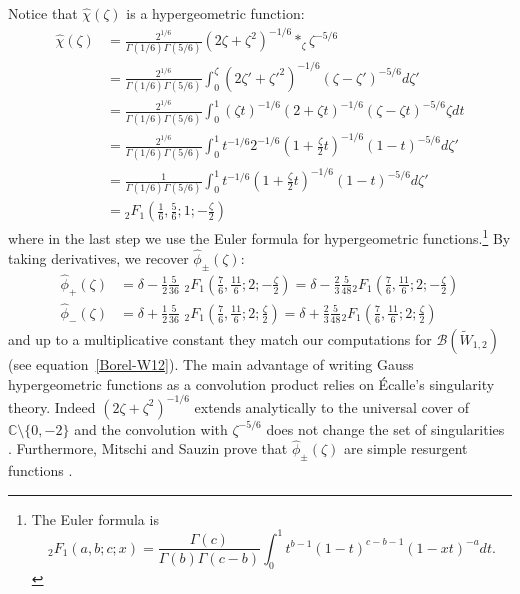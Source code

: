 \documentclass{article}
\newcommand{\C}{\mathbb{C}}
\newcommand{\series}[1]{\tilde{#1}}
\newcommand{\borel}{\mathcal{B}}
\theoremstyle{definition}
\theoremstyle{plain}
\begin{document}
Notice that $\hat{\chi}(\zeta)$ is a hypergeometric function:
\begin{align*}
\hat{\chi}(\zeta)&=\frac{2^{1/6}}{\Gamma(1/6)\Gamma(5/6)}(2\zeta+\zeta^2)^{-1/6}\ast_\zeta \zeta^{-5/6}\\
&=\frac{2^{1/6}}{\Gamma(1/6)\Gamma(5/6)}\int_0^{\zeta}(2\zeta'+\zeta'^2)^{-1/6} (\zeta-\zeta')^{-5/6}d\zeta'\\
&=\frac{2^{1/6}}{\Gamma(1/6)\Gamma(5/6)}\int_0^{1}(\zeta t)^{-1/6}(2+\zeta t)^{-1/6} (\zeta-\zeta t)^{-5/6} \zeta dt\\
&=\frac{2^{1/6}}{\Gamma(1/6)\Gamma(5/6)}\int_0^{1} t^{-1/6} 2^{-1/6}(1+\frac{\zeta}{2} t)^{-1/6} (1-t)^{-5/6}d\zeta'\\
&=\frac{1}{\Gamma(1/6)\Gamma(5/6)}\int_0^{1} t^{-1/6} (1+\frac{\zeta}{2} t)^{-1/6} (1-t)^{-5/6}d\zeta'\\
&={}_2F_1\left(\frac{1}{6},\frac{5}{6};1;-\frac{\zeta}{2}\right)
\end{align*}
where in the last step we use the Euler formula for hypergeometric functions.\footnote{The Euler formula is \begin{equation}\label{Euler formula}
{}_{2}F_1\left(a,b;c;x\right)=\frac{\Gamma(c)}{\Gamma(b)\Gamma(c-b)}\int_0^1 t^{b-1}(1-t)^{c-b-1}(1-xt)^{-a}dt.
\end{equation}} By taking derivatives, we recover $\hat{\phi}_{\pm}(\zeta)$: 
\begin{align*}
\hat{\phi}_+(\zeta)&=\delta-\frac{1}{2}\frac{5}{36}\,\, {}_2F_1\left(\frac{7}{6},\frac{11}{6};2;-\frac{\zeta}{2}\right)=\delta-\frac{2}{3}\frac{5}{48} {}_2F_1\left(\frac{7}{6},\frac{11}{6};2;-\frac{\zeta}{2}\right)\\
\hat{\phi}_-(\zeta)&=\delta+\frac{1}{2}\frac{5}{36}\,\, {}_2F_1\left(\frac{7}{6},\frac{11}{6};2;\frac{\zeta}{2}\right)=\delta+\frac{2}{3}\frac{5}{48} {}_2F_1\left(\frac{7}{6},\frac{11}{6};2;\frac{\zeta}{2}\right)
\end{align*} 
and up to a multiplicative constant they match our computations for $\borel(\tilde{W}_{1,2})$ (see equation~\eqref{Borel-W12}).
The main advantage of writing Gauss hypergeometric functions as a convolution product relies on \'Ecalle's singularity theory. Indeed $(2\zeta+\zeta^2)^{-1/6}$ extends analytically to the universal cover of $\C\setminus\lbrace 0,-2\rbrace$ and the convolution with $\zeta^{-5/6}$ does not change the set of singularities \cite[Section~6.14.5(c)]{diverg-resurg-i}. Furthermore, Mitschi and Sauzin prove that $\hat{\phi}_{\pm}(\zeta)$ are simple resurgent functions \cite[Lemma 6.106]{diverg-resurg-i}. %
%
\end{document}
